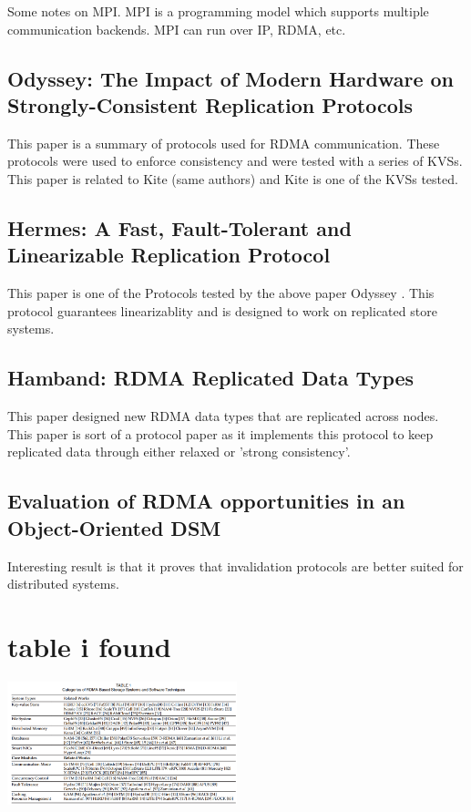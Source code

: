 \documentclass[sigplan,nonacm]{acmart}
\begin{document}
    Some notes on MPI. MPI is a programming model which supports multiple communication backends. MPI 
    can run over IP, RDMA, etc. 

    \subsection {Odyssey: The Impact of Modern Hardware on Strongly-Consistent Replication Protocols}
    This paper is a summary of protocols used for RDMA communication. These protocols were used to 
    enforce consistency and were tested with a series of KVSs. This paper is related to Kite (same authors) 
    and Kite is one of the KVSs tested.\cite{Gavrielatos-EuroSys-2021}

    \subsection {Hermes: A Fast, Fault-Tolerant and Linearizable Replication Protocol}
    This paper \cite{Katsarakis-ASPLOS-2020} is one of the Protocols tested by the above paper Odyssey \cite{Gavrielatos-EuroSys-2021}. This 
    protocol guarantees linearizablity and is designed to work on replicated store systems.

    \subsection {Hamband: RDMA Replicated Data Types}
    This paper \cite{Houshmand-PLDI-2022} designed new RDMA data types that are replicated across nodes. This paper 
    is sort of a protocol paper as it implements this protocol to keep replicated data through either relaxed or 'strong consistency'.

    \subsection{Evaluation of RDMA opportunities in an Object-Oriented DSM}
    Interesting result is that it proves that invalidation protocols are better suited 
    for distributed systems. \cite{Veldema-LCPC-2007}
\section{table i found}
\includegraphics[width=0.5\textwidth]{Table_1_A_Survey_of_Storage_Systems_in_the_RDMA_Era}
\cite{Ma-PDS-2022}
\end{document}
